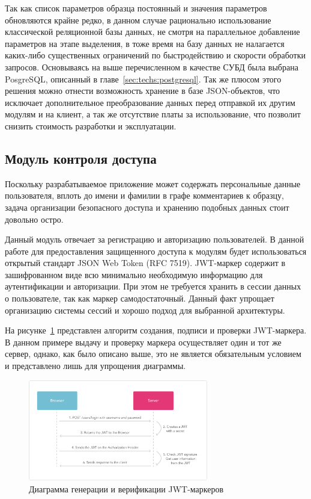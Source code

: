 Так как список параметров образца постоянный и значения параметров обновляются крайне редко, в данном случае рационально использование классической реляционной базы данных, не смотря на параллельное добавление параметров на этапе выделения, в тоже время на базу данных не налагается каких-либо существенных ограничений по быстродействию и скорости обработки запросов. Основываясь на выше перечисленном в качестве СУБД была выбрана PosgreSQL, описанный в главе~\ref{sec:techs:postgresql}.
Так же плюсом этого решения можно отнести возможность хранение в базе JSON-объектов, что исключает дополнительное преобразование данных перед отправкой их другим модулям и на клиент, а так же отсутствие платы за использование, что позволит снизить стоимость разработки и эксплуатации.

\subsection{Модуль контроля доступа}
Поскольку разрабатываемое приложение может содержать персональные данные пользователя, вплоть до имени и фамилии в графе комментариев к образцу, задача организации безопасного доступа и хранению подобных данных стоит довольно остро.

Данный модуль отвечает за регистрацию и авторизацию пользователей. 
В данной работе для предоставления защищенного доступа к модулям будет использоваться открытый стандарт JSON Web Token (RFC 7519). JWT-маркер  содержит в зашифрованном виде всю минимально необходимую информацию для аутентификации и авторизации. При этом не требуется хранить в сессии данных о пользователе, так как маркер самодостаточный. Данный факт упрощает организацию системы сессий и хорошо подход для выбранной архитектуры.

На рисунке~\ref{fig:architecture:jwt_diagram} представлен алгоритм создания, подписи и проверки JWT-маркера. В данном примере выдачу и проверку маркера осуществляет один и тот же сервер, однако, как было описано выше, это не является обязательным условием и представлено лишь для упрощения диаграммы.

\begin{figure}[ht]
    \centering
    \includegraphics[width=0.7\textwidth]{figures/jwt_diagram.png}
    \caption{Диаграмма генерации и верификации JWT-маркеров}
    \label{fig:architecture:jwt_diagram}
\end{figure}

